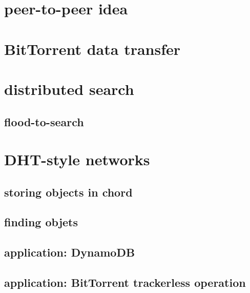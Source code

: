 \section{peer-to-peer idea}



\section{BitTorrent data transfer}



\section{distributed search}



\subsection{flood-to-search}



\section{DHT-style networks}



\subsection{storing objects in chord}


\subsection{finding objets}


\subsection{application: DynamoDB}

\subsection{application: BitTorrent trackerless operation}
